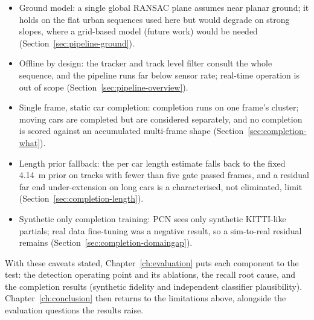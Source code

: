 \documentclass[a4paper,12pt]{report}
\begin{document}
\begin{itemize}
  \item Ground model: a single global RANSAC plane assumes near planar
    ground; it holds on the flat urban sequences used here but would degrade on
    strong slopes, where a grid-based model (future work) would be needed
    (Section~\ref{sec:pipeline-ground}).
  \item Offline by design: the tracker and track level filter consult the
    whole sequence, and the pipeline runs far below sensor rate; real-time operation is
    out of scope (Section~\ref{sec:pipeline-overview}).
  \item Single frame, static car completion: completion runs on one frame's
    cluster; moving cars are completed but are considered separately, and no completion is
    scored against an accumulated multi-frame shape (Section~\ref{sec:completion-what}).
  \item Length prior fallback: the per car length estimate falls back to the
    fixed \SI{4.14}{\meter} prior on tracks with fewer than five gate passed frames, and a
    residual far end under-extension on long cars is a characterised, not eliminated, limit
    (Section~\ref{sec:completion-length}).
  \item Synthetic only completion training: PCN sees only synthetic
    KITTI-like partials; real data fine-tuning was a negative result, so a sim-to-real
    residual remains (Section~\ref{sec:completion-domaingap}).
\end{itemize}

With these caveats stated, Chapter~\ref{ch:evaluation} puts each component to the test:
the detection operating point and its ablations, the recall root cause, and the
completion results (synthetic fidelity and independent classifier plausibility).
Chapter~\ref{ch:conclusion} then returns to the limitations above, alongside the evaluation
questions the results raise.
%
%
\end{document}
